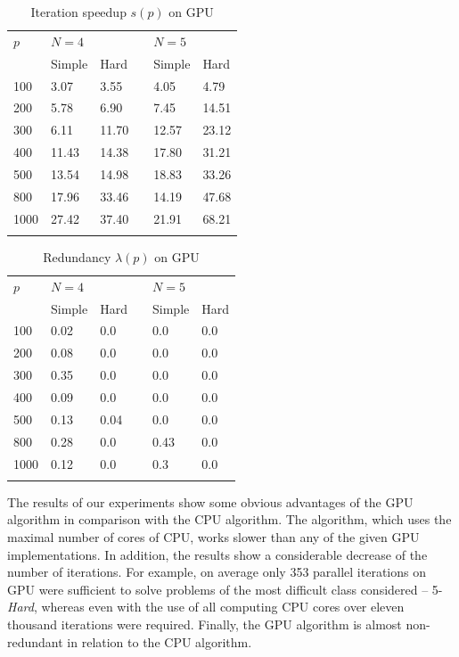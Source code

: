 \documentclass[smallcondensed]{svjour3}     %
\begin{document}
\begin{table}
	\caption{Iteration speedup $s(p)$ on GPU}
	\label{tab:last1}
	\center
	\begin{tabular}{llllll}
		\hline\noalign{\smallskip}
		$p$ & \multicolumn{2}{l}{ $N=4$ } & & \multicolumn{2}{l}{$N=5$} \\
		\noalign{\smallskip} \cline{2-3} \cline{5-6} \noalign{\smallskip}
		 & Simple & Hard & & Simple & Hard  \\
		\noalign{\smallskip} \hline \noalign{\smallskip}
		100	&	3.07	&	3.55	& &	4.05	&	4.79	\\
		200	&	5.78	&	6.90	& &	7.45	&	14.51	\\
		300	&	6.11	&	11.70	& &	12.57	&	23.12	\\
		400	&	11.43	&	14.38	& &	17.80	&	31.21	\\
		500	&	13.54	&	14.98	& &	18.83	&	33.26	\\
		800	&	17.96	&	33.46	& &	14.19	&	47.68	\\
		1000	&	27.42	&	37.40	& &	21.91	&	68.21	\\
		\noalign{\smallskip}\hline
	\end{tabular}
\end{table}


\begin{table}
	\caption{Redundancy $\lambda(p)$ on GPU}
	\label{tab:last}
	\center
	\begin{tabular}{llllll}
		\hline\noalign{\smallskip}
		$p$ & \multicolumn{2}{l}{ $N=4$ } & & \multicolumn{2}{l}{$N=5$} \\
		\noalign{\smallskip} \cline{2-3} \cline{5-6} \noalign{\smallskip}
		 & Simple & Hard & & Simple & Hard  \\
		\noalign{\smallskip} \hline \noalign{\smallskip}
		100 & 0.02 & 0.0 & & 0.0 & 0.0  \\
		200 & 0.08 & 0.0 & & 0.0 & 0.0  \\
		300 & 0.35 & 0.0 & & 0.0 & 0.0  \\
		400 & 0.09 & 0.0 & & 0.0 & 0.0  \\
		500 & 0.13 & 0.04 & & 0.0 & 0.0  \\
		800 & 0.28 & 0.0 & & 0.43 & 0.0  \\
		1000 & 0.12 & 0.0 & & 0.3 & 0.0  \\
		\noalign{\smallskip}\hline
	\end{tabular}
\end{table}

The results of our experiments show some obvious advantages of the GPU algorithm in comparison with the CPU algorithm. The algorithm, which uses the maximal number of cores of CPU, works slower than any of the given GPU implementations. In addition, the results show a considerable decrease of the number of iterations. For example, on average only 353 parallel iterations on GPU were sufficient to solve problems of the most difficult class considered -- 5-\textit{Hard}, whereas even with the use of all computing CPU cores over eleven thousand iterations were required. Finally, the GPU algorithm is almost non-redundant in relation to the CPU algorithm.
\end{document}
